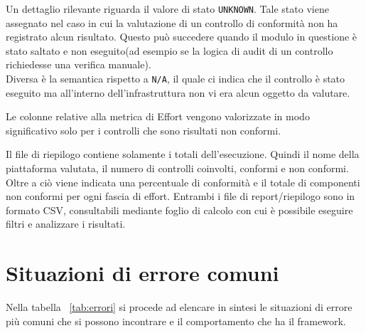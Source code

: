 \documentclass[a4paper,11pt]{report}
\begin{document}
Un dettaglio rilevante riguarda il valore di stato \texttt{UNKNOWN}. Tale stato viene assegnato nel caso in cui la valutazione di un controllo di conformità non ha registrato alcun risultato. Questo può succedere quando il modulo in questione è stato saltato e non eseguito(ad esempio se la logica di audit di un controllo richiedesse una verifica manuale).\\
Diversa è la semantica rispetto a \texttt{N/A}, il quale ci indica che il controllo è stato eseguito ma all'interno dell'infrastruttura non vi era alcun oggetto da valutare.

Le colonne relative alla metrica di Effort vengono valorizzate in modo significativo solo per i controlli che sono risultati non conformi. 

Il file di riepilogo contiene solamente i totali dell'esecuzione. Quindi il nome della piattaforma valutata, il numero di controlli coinvolti, conformi e non conformi. Oltre a ciò viene indicata una percentuale di conformità e il totale di componenti non conformi per ogni fascia di effort.
Entrambi i file di report/riepilogo sono in formato CSV, consultabili mediante foglio di calcolo con cui è possibile eseguire filtri e analizzare i risultati.

\section{Situazioni di errore comuni}

Nella tabella ~\ref{tab:errori} si procede ad elencare in sintesi le situazioni di errore più comuni che si possono incontrare e il comportamento che ha il framework.
\end{document}
